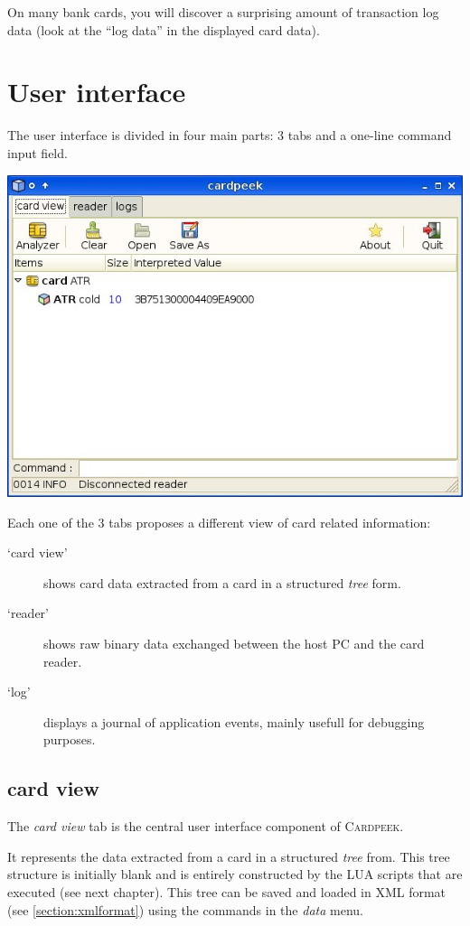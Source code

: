 \documentclass[11pt]{report}
\newcommand{\Cardpeek}{\textsc{Cardpeek}}
\begin{document}
On many bank cards, you will discover a surprising amount of transaction log data (look at the ``log data'' 
in the displayed card data).

\section{User interface}

The user interface is divided in four main parts: 3 tabs and a one-line command input field.

\begin{center}
\includegraphics[width=.75\textwidth]{graphics/sample-blank.jpg}
\end{center}

Each one of the 3 tabs proposes a different view of card related information:
\begin{description}
\item[`card view']{shows card data extracted from a card in a structured \emph{tree} form.}  
\item[`reader']{shows raw binary data exchanged between the host PC and the card reader.}
\item[`log']{displays a journal of application events, mainly usefull for debugging purposes.}  
\end{description}

\subsection{card view}

The \emph{card view} tab is the central user interface component of \Cardpeek. 

It represents the data extracted from a card in a structured \emph{tree} from.
This tree structure is initially blank and is entirely constructed by the LUA scripts that are executed (see next chapter).
This tree can be saved and loaded in XML format (see \ref{section:xmlformat}) using the commands in the \emph{data} menu.
\end{document}
